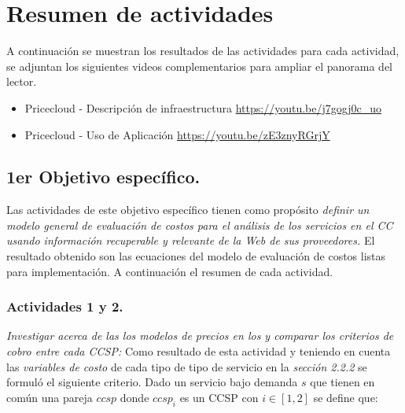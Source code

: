 
\chapter{Resumen de actividades} %

\label{ch:metodologia} %

A continuación se muestran los resultados de las actividades para cada actividad, se adjuntan los siguientes videos complementarios para ampliar el panorama del lector.

\begin{itemize}

    \item Pricecloud - Descripción de infraestructura
    \newline
    \url{https://youtu.be/j7gogj0c_uo}
    
    \item Pricecloud - Uso de Aplicación
    \newline
    \url{https://youtu.be/zE3znyRGrjY}
\end{itemize}

\section{1er Objetivo específico.}
Las actividades de este objetivo específico tienen como propósito \emph{definir un modelo general de evaluación de costos para el análisis de los servicios en el \acrshort{CC} usando información recuperable y relevante de la Web de sus proveedores.} El resultado obtenido son las ecuaciones del modelo de evaluación de costos listas para implementación. A continuación el resumen de cada actividad.

\subsection{Actividades 1 y 2.}
\emph{Investigar acerca de las los modelos de precios en los  y comparar los criterios de cobro entre cada \acrshort{CCSP}:}
\newline
\newline
Como resultado de esta actividad y teniendo en cuenta las \emph{variables de costo} de cada tipo de tipo de servicio en la \emph{sección 2.2.2} se formuló el siguiente criterio.
\newline
\newline
Dado un servicio bajo demanda \(s\) que tienen en común una pareja $ccsp$ donde $ccsp_i$ es un \acrshort{CCSP} con $i \in [1,2]$ se define que:

